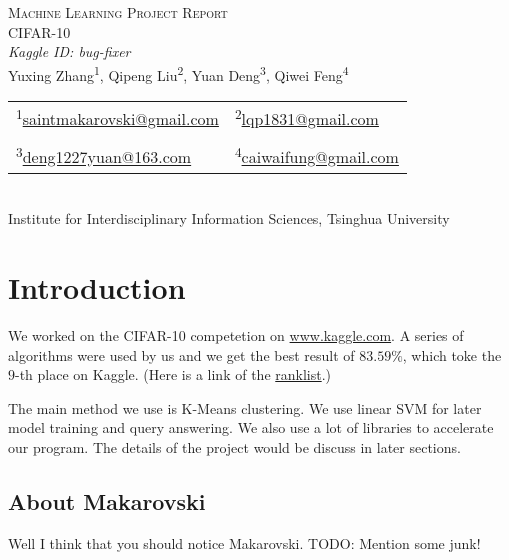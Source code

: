 \documentclass[12pt,abstract=true]{scrartcl}
\newcommand\upper[1]{\textsuperscript#1}
\numberwithin{equation}{section}
\theoremstyle{definition}   \newtheorem{definition}{Definition}[section]
\theoremstyle{plain}        \newtheorem{theorem}{Theorem}[section]
\theoremstyle{plain}        \newtheorem{observation}{Observation}[section]
\theoremstyle{plain}        \newtheorem{fact}{Fact}[section]
\theoremstyle{plain}        \newtheorem{claim}{Claim}[section]
\theoremstyle{plain}        \newtheorem{lemma}[theorem]{Lemma}
\theoremstyle{plain}        \newtheorem{corollary}[theorem]{Corollary}
\theoremstyle{remark}       \newtheorem{example}{Example}[section]
\theoremstyle{remark}       \newtheorem{remark}{Remark}[section]
\newcommand{\scorebest}{$83.59\%$}
\newcommand{\rankbest}{$9$}
\begin{document}
\begin{center} %
	\textsc{
		\LARGE Machine Learning Project Report
	} \\[1em]
	
	\textrm{
		{\Large CIFAR-10}
	} \\[2em]
	
	\textit{
		Kaggle ID: bug-fixer
	} \\[1em]
	
	\normalsize 
		Yuxing Zhang\upper{1}, Qipeng Liu\upper{2},
		Yuan Deng\upper{3},	Qiwei Feng\upper{4}\\[1.5em]
	\small
	\begin{tabular}{*{2}{>{\centering}p{}}}
		\upper{1}\small\href{mailto:saintmakarovski@gmail.com}{saintmakarovski@gmail.com} &%
		\upper{2}\href{mailto:lqp1831@gmail.com}{lqp1831@gmail.com}
		\tabularnewline
		\tabularnewline
		\upper{3}\href{mailto:deng1227yuan@163.com}{deng1227yuan@163.com} &
		\upper{4}\href{mailto:caiwaifung@gmail.com}{caiwaifung@gmail.com} 
	\end{tabular} \\[1.5em]

	\normalsize Institute for Interdisciplinary Information Sciences,
	Tsinghua University \\[2em]
	
	\normalsize
\end{center} \par %

\tableofcontents
\newpage

\section{Introduction}
	We worked on the CIFAR-10 competetion on
		\href{http://www.kaggle.com/c/cifar-10}{www.kaggle.com}.
	A series of algorithms were used by us and we get the best result of \scorebest,
		which toke the \rankbest-th place on Kaggle.
	(Here is a link of the
		\href{http://www.kaggle.com/c/cifar-10/leaderboard}{ranklist}.)
		
	The main method we use is K-Means clustering.
	We use linear SVM for later model training and query answering.
	We also use a lot of libraries to accelerate our program.
	The details of the project would be discuss in later sections.
	
	\subsection{About Makarovski}
		Well I think that you should notice Makarovski.
		{\color{red}TODO: Mention some junk!}
		
\end{document}
